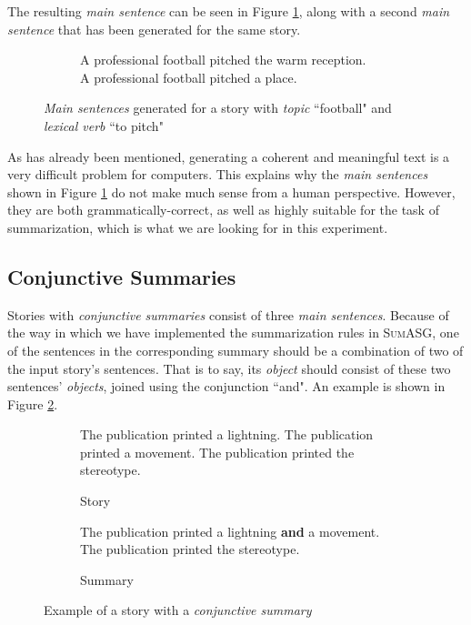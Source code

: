 The resulting \textit{main sentence} can be seen in Figure \ref{fig:main_sentences_example}, along with a second \textit{main sentence} that has been generated for the same story.

\begin{figure}[H]
\begin{subfigure}{\textwidth}
\begin{displayquote}
A professional football pitched the warm reception. \\
A professional football pitched a place.
\end{displayquote}
\end{subfigure}
\caption{\textit{Main sentences} generated for a story with \textit{topic} ``football" and \textit{lexical verb} ``to pitch"}
\label{fig:main_sentences_example}
\end{figure}

\noindent
As has already been mentioned, generating a coherent and meaningful text is a very difficult problem for computers. This explains why the \textit{main sentences} shown in Figure \ref{fig:main_sentences_example} do not make much sense from a human perspective. However, they are both grammatically-correct, as well as highly suitable for the task of summarization, which is what we are looking for in this experiment.

\subsection{Conjunctive Summaries}

Stories with \textit{conjunctive summaries} consist of three \textit{main sentences}. Because of the way in which we have implemented the summarization rules in \textsc{SumASG}, one of the sentences in the corresponding summary should be a combination of two of the input story's sentences. That is to say, its \textit{object} should consist of these two sentences' \textit{objects}, joined using the conjunction ``and". An example is shown in Figure \ref{fig:conjunctive_summary_example}.

\begin{figure}[H]
\begin{subfigure}{\textwidth}
\begin{displayquote}
The publication printed a lightning. The publication printed a movement. The publication printed the stereotype.
\end{displayquote}
\caption{Story}
\vspace{\baselineskip}
\end{subfigure}
\begin{subfigure}{\textwidth}
\begin{displayquote}
The publication printed a lightning \textbf{and} a movement. The publication printed the stereotype.
\end{displayquote}
\caption{Summary}
\end{subfigure}
\caption{Example of a story with a \textit{conjunctive summary}}
\label{fig:conjunctive_summary_example}
\end{figure}

